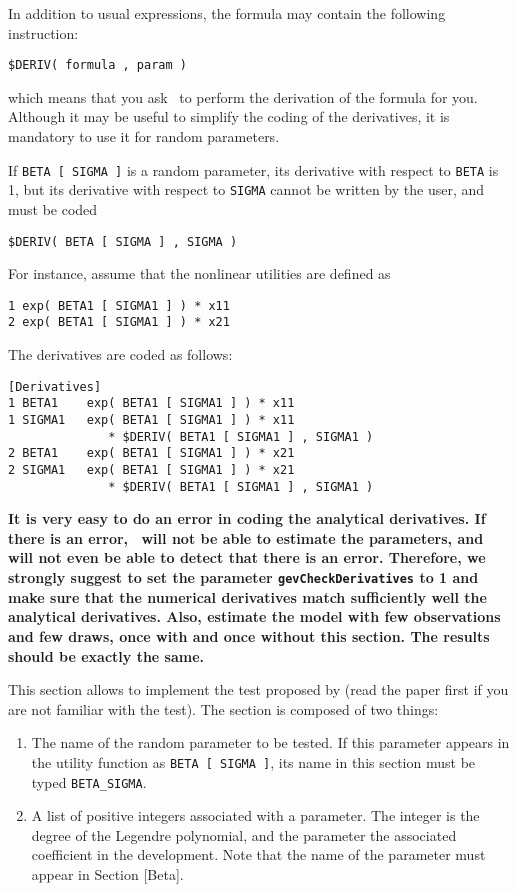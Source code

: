 \documentclass[12pt]{memoir}
\begin{document}
\begin{description}
In addition to usual  expressions, the formula may contain the following instruction:
{\footnotesize
\begin{verbatim}
$DERIV( formula , param )
\end{verbatim}
}
which means that you ask \BIOGEME\ to perform the derivation of the
formula for you. Although it may be useful to simplify the coding of
the derivatives, it is mandatory to use it for random parameters.

If \verb+BETA [ SIGMA ]+ is a random parameter, its derivative with
respect to \verb+BETA+ is 1, but its derivative with respect to
\verb+SIGMA+ cannot be written by the user, and must be coded

{\footnotesize
\begin{verbatim}
$DERIV( BETA [ SIGMA ] , SIGMA )
\end{verbatim}
}

For instance, assume that the nonlinear utilities are defined as
{\footnotesize \begin{verbatim}
1 exp( BETA1 [ SIGMA1 ] ) * x11
2 exp( BETA1 [ SIGMA1 ] ) * x21
\end{verbatim}
}
The derivatives are coded as follows:
{\footnotesize 
\begin{verbatim}
[Derivatives]
1 BETA1    exp( BETA1 [ SIGMA1 ] ) * x11
1 SIGMA1   exp( BETA1 [ SIGMA1 ] ) * x11 
              * $DERIV( BETA1 [ SIGMA1 ] , SIGMA1 )
2 BETA1    exp( BETA1 [ SIGMA1 ] ) * x21
2 SIGMA1   exp( BETA1 [ SIGMA1 ] ) * x21 
              * $DERIV( BETA1 [ SIGMA1 ] , SIGMA1 )
\end{verbatim}
}

\textbf{It is very easy to do an error in coding the analytical
derivatives. If there is an error, \BIOGEME\ will not be able to
estimate the parameters, and will not even be able to detect that
there is an error. Therefore, we strongly suggest to set the parameter
\texttt{gevCheckDerivatives} to 1 and make
sure that the numerical derivatives match sufficiently well the
analytical derivatives. Also, estimate the model with few observations
and few draws, once with and once without this section. The results
should be exactly the same.}

\item[\specitem{SNP}] This section allows to implement the test proposed by  (read the paper first if you are not familiar with the test). 
The section is composed of two things:
\begin{enumerate}
\item The name of the random parameter to be tested.  If this parameter appears in the
            utility function as \verb+BETA [ SIGMA ]+, its name in this section must be typed  \verb+BETA_SIGMA+. 
\item A list of positive integers associated with a parameter. The integer is the degree of the Legendre polynomial, and the parameter the associated coefficient in the development. Note that the name of the parameter must appear in Section [Beta].
\end{enumerate}


\end{description}
\end{document}
